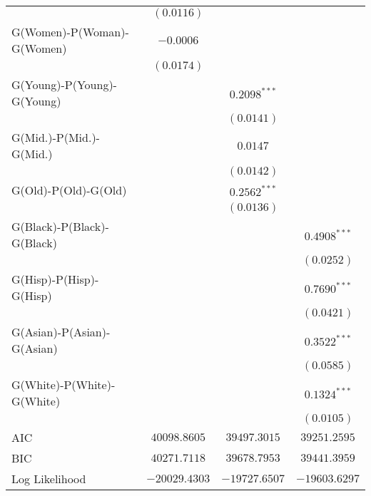 \begin{center}
\begin{longtable}{l c c c}
                           & $(0.0116)$     &                 &                 \\
G(Women)-P(Woman)-G(Women) & $-0.0006$      &                 &                 \\
                           & $(0.0174)$     &                 &                 \\
G(Young)-P(Young)-G(Young) &                & $0.2098^{***}$  &                 \\
                           &                & $(0.0141)$      &                 \\
G(Mid.)-P(Mid.)-G(Mid.)    &                & $0.0147$        &                 \\
                           &                & $(0.0142)$      &                 \\
G(Old)-P(Old)-G(Old)       &                & $0.2562^{***}$  &                 \\
                           &                & $(0.0136)$      &                 \\
G(Black)-P(Black)-G(Black) &                &                 & $0.4908^{***}$  \\
                           &                &                 & $(0.0252)$      \\
G(Hisp)-P(Hisp)-G(Hisp)    &                &                 & $0.7690^{***}$  \\
                           &                &                 & $(0.0421)$      \\
G(Asian)-P(Asian)-G(Asian) &                &                 & $0.3522^{***}$  \\
                           &                &                 & $(0.0585)$      \\
G(White)-P(White)-G(White) &                &                 & $0.1324^{***}$  \\
                           &                &                 & $(0.0105)$      \\
\midrule
AIC                        & $40098.8605$   & $39497.3015$    & $39251.2595$    \\
BIC                        & $40271.7118$   & $39678.7953$    & $39441.3959$    \\
Log Likelihood             & $-20029.4303$  & $-19727.6507$   & $-19603.6297$   \\
\end{longtable}
\end{center}
